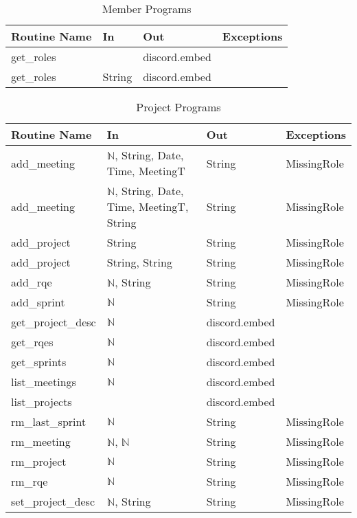 \documentclass[12pt, titlepage]{article}
\begin{document}
\begin{table}[!htb]
    \centering
    \begin{tabular}{|p{3cm}|p{3cm}|p{3cm}|p{4.5cm}|}
        \hline
        \textbf{Routine Name} & \textbf{In} & \textbf{Out} & \textbf{Exceptions} \\
        \hline
        get\_roles & & discord.embed & \\
        \hline
        get\_roles & String & discord.embed & \\
        \hline
    \end{tabular}
    \caption{Member Programs}
    \label{tab:members}
\end{table}

\begin{table}[!htb]
    \centering
    \begin{tabular}{|p{3.5cm}|p{4cm}|p{3cm}|p{3cm}|}
        \hline
        \textbf{Routine Name} & \textbf{In} & \textbf{Out} & \textbf{Exceptions} \\
        \hline
        add\_meeting & $\mathbb{N}$, String, Date, Time, MeetingT & String & MissingRole\\
        \hline
        add\_meeting & $\mathbb{N}$, String, Date, Time, MeetingT, String & String & MissingRole\\
        \hline
        add\_project & String & String & MissingRole \\
        \hline
        add\_project & String, String & String & MissingRole \\
        \hline
        add\_rqe & $\mathbb{N}$, String & String & MissingRole \\
        \hline
        add\_sprint & $\mathbb{N}$ & String & MissingRole \\
        \hline
        get\_project\_desc & $\mathbb{N}$ & discord.embed & \\
        \hline
        get\_rqes & $\mathbb{N}$ & discord.embed & \\
        \hline
        get\_sprints & $\mathbb{N}$ & discord.embed & \\
        \hline
        list\_meetings & $\mathbb{N}$ & discord.embed & \\
        \hline
        list\_projects & & discord.embed & \\
        \hline
        rm\_last\_sprint & $\mathbb{N}$ & String & MissingRole \\
        \hline
        rm\_meeting & $\mathbb{N}$, $\mathbb{N}$ & String & MissingRole \\
        \hline
        rm\_project & $\mathbb{N}$ & String & MissingRole \\
        \hline
        rm\_rqe & $\mathbb{N}$ & String & MissingRole \\
        \hline
        set\_project\_desc & $\mathbb{N}$, String & String & MissingRole \\
        \hline
    \end{tabular}
    \caption{Project Programs}
    \label{tab:project}
\end{table}
\end{document}
